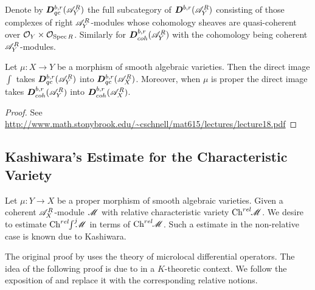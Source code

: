     Denote by $\boldsymbol{D}^{b,r}_{qc}(\mathscr{A}_Y^{R})$ the full subcategory of $\boldsymbol{D}^{b,r}(\mathscr{A}_Y^R)$ consisting of those complexes of right $\mathscr{A}_Y^R$-modules whose cohomology sheaves are quasi-coherent over $\mathcal{O}_Y\times \mathcal{O}_{\operatorname{Spec} R}$. Similarly for $\boldsymbol{D}^{b,r}_{coh}(\mathscr{A}_Y^R)$ with the cohomology being coherent $\mathscr{A}_Y^R$-modules.
    \begin{theorem}\label{thm: ConservationQuasiCoherentAndCoherentIfProper}
        Let $\mu:X\to Y$ be a morphism of smooth algebraic varieties. Then the direct image $\int$ takes $\boldsymbol{D}^{b,r}_{qc}(\mathscr{A}_Y^{R})$ into $\boldsymbol{D}^{b,r}_{qc}(\mathscr{A}_X^{R})$. Moreover, when $\mu$ is proper the direct image takes $\boldsymbol{D}^{b,r}_{coh}(\mathscr{A}_Y^R)$ into $\boldsymbol{D}^{b,r}_{coh}(\mathscr{A}_X^R)$.
    \end{theorem}
    \begin{proof}
      See \url{http://www.math.stonybrook.edu/~cschnell/mat615/lectures/lecture18.pdf}
    \end{proof}
\subsection{Kashiwara's Estimate for the Characteristic Variety}
Let $\mu:Y\to X$ be a proper morphism of smooth algebraic varieties. Given a coherent $\mathscr{A}_X^R$-module $\mathscr{M}$ with relative characteristic variety $\operatorname{Ch}^{rel}\mkern-5mu \mathscr{M}$. We desire to estimate $\operatorname{Ch}^{rel}\mkern-5mu \int^j \mkern -8mu \mathscr{M}$ in terms of $\operatorname{Ch}^{rel}\mkern-5mu\mathscr{M}$. Such a estimate in the non-relative case is known due to Kashiwara. %

The original proof by \cite{kashiwara1976b} uses the theory of microlocal differential operators. The idea of the following proof is due to \cite{malgrange1985images} in a $K$-theoretic context. We follow the exposition of \cite{sabbah2011introduction} and replace it with the corresponding relative notions. %
\\

